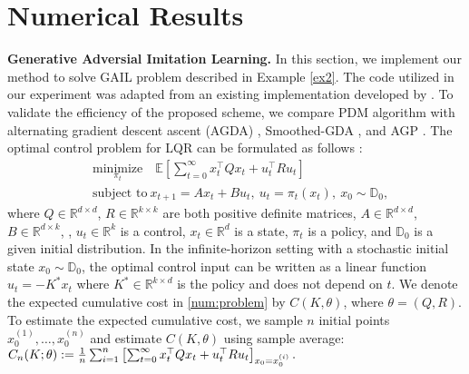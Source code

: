 \documentclass[letterpaper,11 pt]{article}
\newcommand{\afj}[1]{{\color{black}#1}}
\begin{document}
\section{Numerical Results}\label{sec:numeric}
{\bf Generative Adversial Imitation Learning.} In this section, we implement our method to solve GAIL problem described in Example \ref{ex2}. The code utilized in our experiment was adapted from an existing implementation developed by \cite{yang2020global}. %
To validate the efficiency of the proposed scheme, \afj{we compare PDM algorithm with alternating gradient descent ascent (AGDA) \cite{yang2020global}, Smoothed-GDA \cite{zhang2020single}, and AGP \cite{xu2020unified}.} 
The optimal control problem for LQR can be formulated as follows \cite{cai2019global}:  
\begin{align}\label{num:problem}
&\underset{\pi_t}{\text{minimize} }\quad \mathbb E\left[\sum_{t=0}^{\infty}x_t^{\top}Qx_t + u_t^{\top}Ru_t\right]\\
\nonumber&\text{subject to}\ x_{t+1}=Ax_t+Bu_t,\ u_t=\pi_t(x_t), \ 
x_0\sim \mathbb D_0,
\end{align}
where $Q\in \mathbb R^{d\times d }$, $R\in \mathbb R^{k\times k}$ are both positive definite matrices,  $A\in \mathbb R^{d\times d }$, $B\in \mathbb R^{d\times k }$, , $u_t\in \mathbb R^{k}$ is a control, $x_t\in \mathbb R^{d}$ is a state, $\pi_t$ is a policy, and $\mathbb D_0$ is a given initial distribution. In the infinite-horizon setting with a stochastic initial state $x_0\sim \mathbb D_0$, the optimal control input can be written as a linear function $u_t=-K^*x_t$ where $K^*\in \mathbb R ^{k\times d}$ is the  policy and does not depend on $t$. We denote the expected cumulative cost in \eqref{num:problem} by $C(K,\theta)$, where $\theta=(Q,R)$. To estimate the expected cumulative cost, we sample $n$ initial points $x_0^{(1)},\hdots,x_0^{(n)}$ and estimate $C(K,\theta)$ using sample average:
$C_{n}(K;\theta):={1\over n} \sum_{i=1}^{n} \left[\sum_{t=0}^{\infty}x_t^{\top}Qx_t + u_t^{\top}Ru_t\right]_{x_0=x_0^{(i)}}.$
\end{document}

